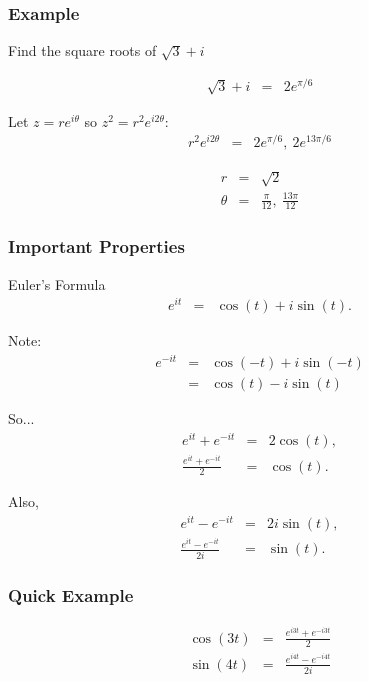 \begin{frame}
  \frametitle{Example}

  Find the square roots of $\sqrt{3}+i$

  \begin{eqnarray*}
    \sqrt{3} + i & = & 2 e^{\pi/6} 
  \end{eqnarray*}

  Let $z=re^{i\theta}$ so $z^2=r^2e^{i2\theta}$:
  \begin{eqnarray*}
    r^2e^{i2\theta} & = & 2 e^{\pi/6} , ~ 2 e^{13\pi/6} 
  \end{eqnarray*}

  \begin{eqnarray*}
    r & = & \sqrt{2} \\
    \theta & = & \frac{\pi}{12}, ~ \frac{13\pi}{12}
  \end{eqnarray*}

\end{frame}


\begin{frame}
  \frametitle{Important Properties}

  Euler's Formula
  \begin{eqnarray*}
    e^{it} & = & \cos(t) + i\sin(t). 
  \end{eqnarray*}

  Note:
  \begin{eqnarray*}
    e^{-it} & = & \cos(-t) + i\sin(-t) \\
    & = & \cos(t) - i\sin(t)
  \end{eqnarray*}

  So...
  \begin{eqnarray*}
    e^{it} + e^{-it} & = & 2 \cos(t), \\
    \frac{e^{it} + e^{-it}}{2} & = & \cos(t).
  \end{eqnarray*}

  Also,
  \begin{eqnarray*}
    e^{it} - e^{-it} & = & 2 i \sin(t), \\
    \frac{e^{it} - e^{-it}}{2i} & = & \sin(t).
  \end{eqnarray*}



\end{frame}


\begin{frame}
  \frametitle{Quick Example}

  \begin{eqnarray*}
    \cos(3t) & = & \frac{e^{i3t}+e^{-i3t}}{2} \\
    \sin(4t) & = & \frac{e^{i4t}-e^{-i4t}}{2i}
  \end{eqnarray*}

\end{frame}


